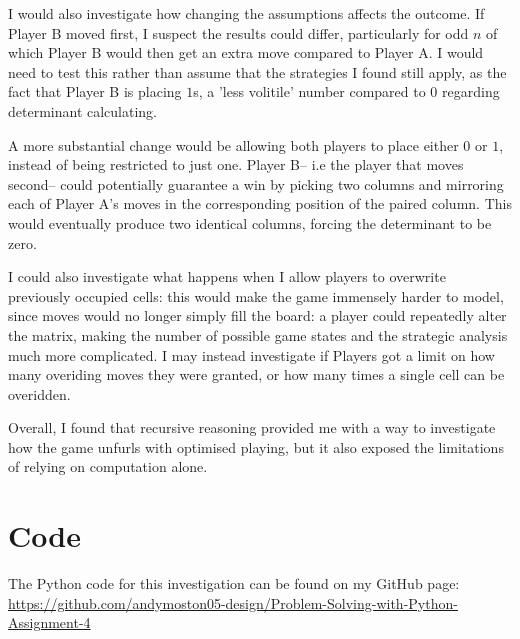 \documentclass[11pt]{article}
\newcommand{\keywordfont}{\textsc}
\newcommand{\keyword}[1]{%
  \marginpar{\raggedright\small\keywordfont{#1}}}
\begin{document}
I would also investigate how changing the assumptions affects the outcome. If Player B moved first, I suspect the results could differ, particularly for odd $n$ of which Player B would then get an extra move compared to Player A. I would need to test this rather than assume that the strategies I found still apply, as the fact that Player B is placing $1$s, a 'less volitile' number compared to $0$ regarding determinant calculating.

\keyword{Extend} A more substantial change would be allowing both players to place either $0$ or $1$, instead of being restricted to just one. Player B-- i.e the player that moves second-- could potentially guarantee a win by picking two columns and mirroring each of Player A's moves in the corresponding position of the paired column. This would eventually produce two identical columns, forcing the determinant to be zero.

I could also investigate what happens when I allow players to overwrite previously occupied cells: this would make the game immensely harder to model, since moves would no longer simply fill the board: a player could repeatedly alter the matrix, making the number of possible game states and the strategic analysis much more complicated. I may instead investigate if Players got a limit on how many overiding moves they were granted, or how many times a single cell can be overidden.

Overall, I found that recursive reasoning provided me with a way to investigate how the game unfurls with optimised playing, but it also exposed the limitations of relying on computation alone.

\section*{Code}

The Python code for this investigation can be found on my GitHub page:\\
\url{https://github.com/andymoston05-design/Problem-Solving-with-Python-Assignment-4}
\end{document}
